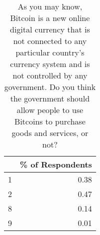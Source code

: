 \begin{table}[ht]
\centering
\begin{tabular}{rr}
  \hline
 & \% of Respondents \\ 
  \hline
1 & 0.38 \\ 
  2 & 0.47 \\ 
  8 & 0.14 \\ 
  9 & 0.01 \\ 
   \hline
\end{tabular}
\caption{As you may know, Bitcoin is a new online digital currency that is not connected to any particular country's currency system and is not controlled by any government. Do you think the government should allow people to use Bitcoins to purchase goods and services, or not?} 
\end{table}
